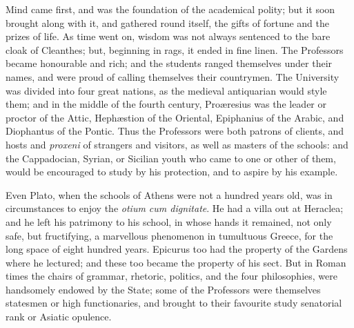 Mind came first, and was the foundation of the academical polity;
but it soon brought along with it, and gathered round itself, the
gifts of fortune and the prizes of life. As time went on, wisdom was
not always sentenced to the bare cloak of Cleanthes; but, beginning in
rags, it ended in fine linen. The Professors became honourable and
rich; and the students ranged themselves under their names, and were
proud of calling themselves their countrymen. The University was
divided into four great nations, as the medieval antiquarian would
style them; and in the middle of the fourth century, Proæresius
was the leader or proctor of the Attic, Hephæstion of the Oriental,
Epiphanius of the Arabic, and Diophantus of the Pontic. Thus the
Professors were both patrons of clients, and hosts and \emph{proxeni}
of strangers and visitors, as well as masters of the schools: and the
Cappadocian, Syrian, or Sicilian youth who came to one or other of
them, would be encouraged to study by his protection, and to aspire by
his example.

Even Plato, when the schools of Athens were not a hundred years
old, was in circumstances to enjoy the \emph{otium cum dignitate}. He
had a villa out at Heraclea; and he left his patrimony to his school,
in whose hands it remained, not only safe, but fructifying, a
marvellous phenomenon in tumultuous Greece, for the long space of
eight hundred years. Epicurus too had the property of the Gardens
where he lectured; and these too became the property of his sect. But
in Roman times the chairs of grammar, rhetoric, politics, and the four
philosophies, were handsomely endowed by the State; some of the
Professors were themselves statesmen or high functionaries, and
brought to their favourite study senatorial rank or Asiatic opulence.

